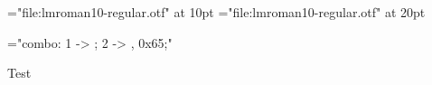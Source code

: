 

\font\regular="file:lmroman10-regular.otf" at 10pt
\font\large="file:lmroman10-regular.otf" at 20pt

\font\mixedfont="combo: 1 -> \fontid\regular; 2 -> \fontid\large, 0x65;"
\mixedfont

Test

\bye
